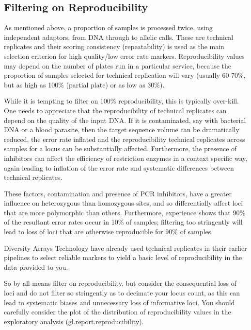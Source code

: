 \documentclass[
  letterpaper,
  DIV=11,
  numbers=noendperiod]{scrreprt}
\begin{document}
\hypertarget{filtering-on-reproducibility-1}{%
\subsection{Filtering on
Reproducibility}\label{filtering-on-reproducibility-1}}

As mentioned above, a proportion of samples is processed twice, using
independent adaptors, from DNA through to allelic calls. These are
technical replicates and their scoring consistency (repeatability) is
used as the main selection criterion for high quality/low error rate
markers. Reproducibility values may depend on the number of plates run
in a particular service, because the proportion of samples selected for
technical replication will vary (usually 60-70\%, but as high as 100\%
(partial plate) or as low as 30\%).

While it is tempting to filter on 100\% reproducibility, this is
typically over-kill. One needs to appreciate that the reproducibility of
technical replicates can depend on the quality of the input DNA. If it
is contaminated, say with bacterial DNA or a blood parasite, then the
target sequence volume can be dramatically reduced, the error rate
inflated and the reproducibility technical replicates across samples for
a locus can be substantially affected. Furthermore, the presence of
inhibitors can affect the efficiency of restriction enzymes in a context
specific way, again leading to inflation of the error rate and
systematic differences between technical replicates.

These factors, contamination and presence of PCR inhibitors, have a
greater influence on heterozygous than homozygous sites, and so
differentially affect loci that are more polymorphic than others.
Furthermore, experience shows that 90\% of the resultant error rates
occur in 10\% of samples; filtering too stringently will lead to loss of
loci that are otherwise reproducible for 90\% of samples.

Diversity Arrays Technology have already used technical replicates in
their earlier pipelines to select reliable markers to yield a basic
level of reproducibility in the data provided to you.

So by all means filter on reproducibility, but consider the
consequential loss of loci and do not filter so stringently as to
decimate your locus count, as this can lead to systematic biases and
unnecessary loss of informative loci. You should carefully consider the
plot of the distribution of reproducibility values in the exploratory
analysis (gl.report.reproducibility).
\end{document}
